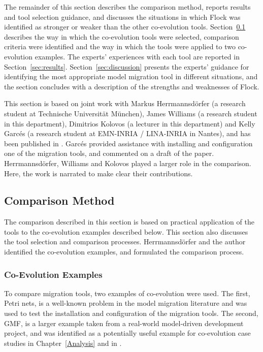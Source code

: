 The remainder of this section describes the comparison method, reports results and tool selection guidance, and discusses the situations in which Flock was identified as stronger or weaker than the other co-evolution tools. Section~\ref{sec:method} describes the way in which the co-evolution tools were selected, comparison criteria were identified and the way in which the tools were applied to two co-evolution examples. The experts' experiences with each tool are reported in Section~\ref{sec:results}. Section~\ref{sec:discussion} presents the experts' guidance for identifying the most appropriate model migration tool in different situations, and the section concludes with a description of the strengths and weaknesses of Flock.

\begin{framed}
This section is based on joint work with Markus Herrmannsd\"{o}rfer (a research student at Technische Universit\"at M\"unchen), James Williams (a research student in this department), Dimitrios Kolovos (a lecturer in this department) and Kelly Garc\'{e}s (a research student at EMN-INRIA / LINA-INRIA in Nantes), and has been published in \cite{rose10comparison}. Garc\'{e}s provided assistance with installing and configuration one of the migration tools, and commented on a draft of the paper. Herrmannsd\"{o}rfer, Williams and Kolovos played a larger role in the comparison. Here, the work is narrated to make clear their contributions.
\end{framed}

\subsection{Comparison Method}
\label{sec:method}

\newcommand{\mm}[1]{\texttt{#1}}
The comparison described in this section is based on practical application of the tools to the co-evolution examples described below. This section also discusses the tool selection and comparison processes. Herrmannsd\"{o}rfer and the author identified the co-evolution examples, and formulated the comparison process.

\subsubsection{Co-Evolution Examples}
\label{subsec:method_examples}
To compare migration tools, two examples of co-evolution were used. The first, Petri nets, is a well-known problem in the model migration literature and was used to test the installation and configuration of the migration tools. The second, GMF, is a larger example taken from a real-world model-driven development project, and was identified as a potentially useful example for co-evolution case studies in Chapter~\ref{Analysis} and in \cite{herrmannsdoerfer09gmf}.

